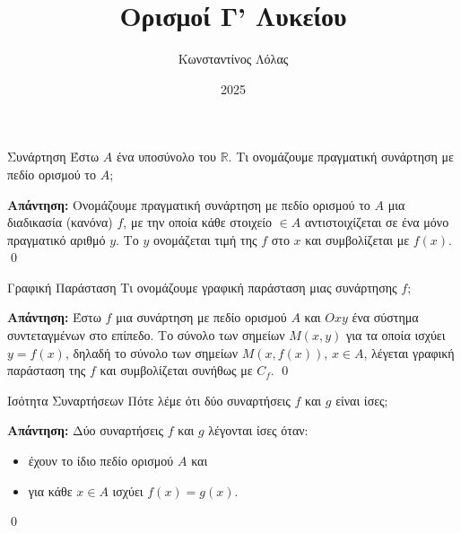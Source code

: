 \documentclass[a4paper, 12pt]{article}
\title{Ορισμοί Γ' Λυκείου}
\author{Κωνσταντίνος Λόλας}
\date{2025}
\renewenvironment{proof}[1][\textbf{Απάντηση}]{%
  \par\noindent\textbf{#1:} \rmfamily}{\qed\par}
\begin{document}
\pagestyle{fancy}
\fancyhead{} %
\fancyfoot{} %

\maketitle

\begin{theorem}{Συνάρτηση}
  Έστω $Α$ ένα υποσύνολο του $\mathbb{R}$. Τι ονομάζουμε πραγματική συνάρτηση με πεδίο ορισμού το $Α$;
\end{theorem}
\begin{proof}
  Ονομάζουμε πραγματική συνάρτηση με πεδίο ορισμού το $Α$ μια διαδικασία (κανόνα) $f$, με την οποία κάθε στοιχείο $\in Α$ αντιστοιχίζεται σε ένα μόνο πραγματικό αριθμό $y$. Το $y$ ονομάζεται τιμή της $f$ στο $x$ και συμβολίζεται με $f(x)$.
\end{proof}

\begin{theorem}{Γραφική Παράσταση}
  Τι ονομάζουμε γραφική παράσταση μιας συνάρτησης $f$;
\end{theorem}
\begin{proof}
  Έστω $f$ μια συνάρτηση με πεδίο ορισμού $Α$ και $Oxy$ ένα σύστημα συντεταγμένων στο επίπεδο. Το σύνολο των σημείων $M(x, y)$ για τα οποία ισχύει $y = f(x)$, δηλαδή το σύνολο των σημείων $M(x, f(x))$, $x \in A$, λέγεται γραφική παράσταση της $f$ και συμβολίζεται συνήθως με $C_f$.
\end{proof}

\begin{theorem}{Ισότητα Συναρτήσεων}
  Πότε λέμε ότι δύο συναρτήσεις $f$ και $g$ είναι ίσες;
\end{theorem}
\begin{proof}
  Δύο συναρτήσεις $f$ και $g$ λέγονται ίσες όταν:
  \begin{itemize}
    \item έχουν το ίδιο πεδίο ορισμού $Α$ και
    \item για κάθε $x \in A$ ισχύει $f(x) = g(x)$.
  \end{itemize}
\end{proof}
\end{document}
